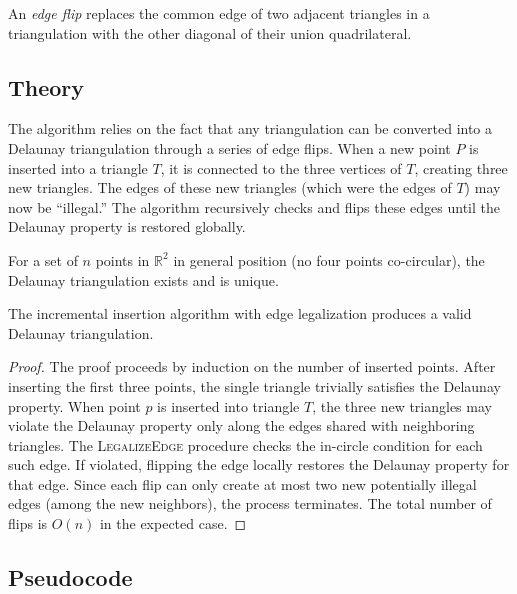 \begin{definition}\label{def:edge_flip}
An \emph{edge flip} replaces the common edge of two adjacent triangles in a triangulation with the other diagonal of their union quadrilateral.
\end{definition}

\subsection{Theory}

The algorithm relies on the fact that any triangulation can be converted into a Delaunay triangulation through a series of edge flips. When a new point $P$ is inserted into a triangle $T$, it is connected to the three vertices of $T$, creating three new triangles. The edges of these new triangles (which were the edges of $T$) may now be ``illegal.'' The algorithm recursively checks and flips these edges until the Delaunay property is restored globally.

\begin{theorem}\label{thm:delaunay_existence}
For a set of $n$ points in $\mathbb{R}^2$ in general position (no four points co-circular), the Delaunay triangulation exists and is unique.
\end{theorem}

\begin{theorem}\label{thm:incremental_delaunay_correctness}
The incremental insertion algorithm with edge legalization produces a valid Delaunay triangulation.
\end{theorem}
\begin{proof}
The proof proceeds by induction on the number of inserted points. After inserting the first three points, the single triangle trivially satisfies the Delaunay property. When point $p$ is inserted into triangle $T$, the three new triangles may violate the Delaunay property only along the edges shared with neighboring triangles. The \textsc{LegalizeEdge} procedure checks the in-circle condition for each such edge. If violated, flipping the edge locally restores the Delaunay property for that edge. Since each flip can only create at most two new potentially illegal edges (among the new neighbors), the process terminates. The total number of flips is $O(n)$ in the expected case.
\end{proof}

\subsection{Pseudocode}

